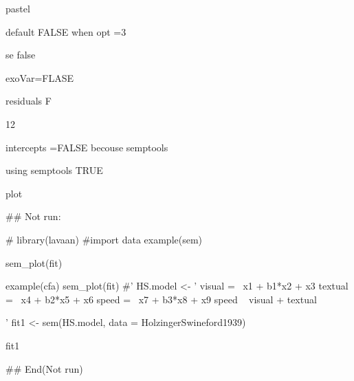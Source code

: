 \documentclass[a4paper]{book}
\begin{document}
\begin{Arguments}
\begin{ldescription}
\item[\code{pastel}] pastel

\item[\code{fade}] default FALSE when opt =3

\item[\code{se}] se false

\item[\code{exoVar}] exoVar=FLASE

\item[\code{residuals}] residuals F

\item[\code{residScale}] 12

\item[\code{intercepts}] intercepts =FALSE becouse semptools

\item[\code{semptools}] using semptools TRUE
\end{ldescription}
\end{Arguments}
%
\begin{Value}
plot
\end{Value}
%
\begin{Examples}
\begin{ExampleCode}

\#\# Not run: 

# library(lavaan)
#import data
example(sem)

sem_plot(fit)

example(cfa)
sem_plot(fit)
#'
HS.model <- '
    visual  =~ x1 + b1*x2 + x3
    textual =~ x4 + b2*x5 + x6
    speed   =~ x7 + b3*x8 + x9
speed ~ visual + textual

'
fit1 <- sem(HS.model, data = HolzingerSwineford1939)

fit1 %

## End(Not run)
\end{ExampleCode}
\end{Examples}
\end{document}
